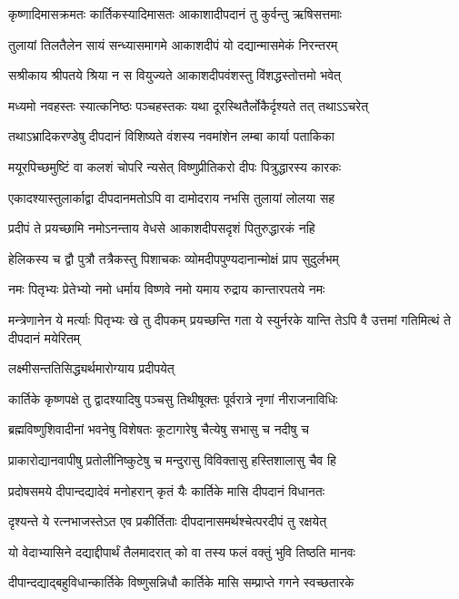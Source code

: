 \twolineshloka
{कृष्णादिमासक्रमतः कार्तिकस्यादिमासतः}
{आकाशादीपदानं तु कुर्वन्तु ऋषिसत्तमाः} %

\twolineshloka
{तुलायां तिलतैलेन सायं सन्ध्यासमागमे}
{आकाशदीपं यो दद्यान्मासमेकं निरन्तरम्} %

\twolineshloka
{सश्रीकाय श्रीपतये श्रिया न स वियुज्यते}
{आकाशदीपवंशस्तु विंशद्धस्तोत्तमो भवेत्} %

\twolineshloka
{मध्यमो नवहस्तः स्यात्कनिष्ठः पञ्चहस्तकः}
{यथा दूरस्थितैर्लोकैर्दृश्यते तत् तथाऽऽचरेत्} %

\twolineshloka
{तथाऽभ्रादिकरण्डेषु दीपदानं विशिष्यते}
{वंशस्य नवमांशेन लम्बा कार्या पताकिका} %

\twolineshloka
{मयूरपिच्छमुष्टिं वा कलशं चोपरि न्यसेत्}
{विष्णुप्रीतिकरो दीपः पित्रुद्धारस्य कारकः} %

\twolineshloka
{एकादश्यास्तुलार्काद्वा दीपदानमतोऽपि वा}
{दामोदराय नभसि तुलायां लोलया सह} %

\twolineshloka
{प्रदीपं ते प्रयच्छामि नमोऽनन्ताय वेधसे}
{आकाशदीपसदृशं पितुरुद्धारकं नहि} %

\twolineshloka
{हेलिकस्य च द्वौ पुत्रौ तत्रैकस्तु पिशाचकः}
{व्योमदीपपुण्यदानान्मोक्षं प्राप सुदुर्लभम्} %

\twolineshloka
{नमः पितृभ्यः प्रेतेभ्यो नमो धर्माय विष्णवे}
{नमो यमाय रुद्राय कान्तारपतये नमः} %

\threelineshloka
{मन्त्रेणानेन ये मर्त्याः पितृभ्यः खे तु दीपकम्}
{प्रयच्छन्ति गता ये स्युर्नरके यान्ति तेऽपि वै}
{उत्तमां गतिमित्थं ते दीपदानं मयेरितम्} %


\onelineshloka
{लक्ष्मीसन्ततिसिद्ध्यर्थमारोग्याय प्रदीपयेत्} %

\twolineshloka
{कार्तिके कृष्णपक्षे तु द्वादश्यादिषु पञ्चसु}
{तिथीषूक्तः पूर्वरात्रे नृणां नीराजनाविधिः} %

\twolineshloka
{ब्रह्मविष्णुशिवादीनां भवनेषु विशेषतः}
{कूटागारेषु चैत्येषु सभासु च नदीषु च} %

\twolineshloka
{प्राकारोद्यानवापीषु प्रतोलीनिष्कुटेषु च}
{मन्दुरासु विविक्तासु हस्तिशालासु चैव हि} %

\twolineshloka
{प्रदोषसमये दीपान्दद्यादेवं मनोहरान्}
{कृतं यैः कार्तिके मासि दीपदानं विधानतः} %

\twolineshloka
{दृश्यन्ते ये रत्नभाजस्तेऽत एव प्रकीर्तिताः}
{दीपदानासमर्थश्चेत्परदीपं तु रक्षयेत्} %

\twolineshloka
{यो वेदाभ्यासिने दद्याद्दीपार्थं तैलमादरात्}
{को वा तस्य फलं वक्तुं भुवि तिष्ठति मानवः} %

\twolineshloka
{दीपान्दद्याद्बहुविधान्कार्तिके विष्णुसन्निधौ}
{कार्तिके मासि सम्प्राप्ते गगने स्वच्छतारके} %

